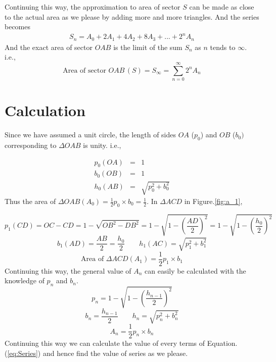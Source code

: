 \documentclass{jpconf}
\theoremstyle{definition} \newtheorem{Definition}{Def{\,}inition}
\begin{document}
Continuing this way, the approximation to area of sector $S$ can be made as close to the actual area as we please by adding more and more triangles. And the series becomes
\begin{eqnarray} \label{eq:Series}
S_n = A_0 + 2A_1 + 4A_2 + 8A_3 + ... + 2^{n}A_n
\end{eqnarray}
And the exact area of sector $OAB$ is the limit of the sum $S_n$ as $n$ tends to $\infty$. i.e.,\[\text{Area of sector } OAB\, (S)= S_\infty = \sum_{n = 0}^{\infty} 2^{n}A_n \]
\section{Calculation}
Since we have assumed a unit circle, the length of sides $OA$ ($p_0$) and $OB$ ($b_0)$ corresponding to $\Delta OAB$ is unity. i.e.,

\begin{eqnarray}
p_0 (OA) &=& 1 \nonumber \\
b_0 (OB) &=& 1 \nonumber \\
h_0 (AB) &=& \sqrt{p_0^2+b_0^2} \nonumber
\end{eqnarray}
Thus the area of $\Delta OAB (A_0) = \frac{1}{2}p_0 \times b_0 = \frac{1}{2}$. In $\Delta ACD$ in Figure.\ref{fig:a_1},

\begin{equation}
p_1 (CD) = OC - CD = 1 - \sqrt{OB^2 - DB^2}  =   1 - \sqrt{1 - \left(\frac{AD}{2}\right)^2} = 1 - \sqrt{1 - \left(\frac{h_0}{2}\right)^2} \nonumber
\end{equation}
\begin{equation}
b_1 (AD) = \frac{AB}{2} =  \frac{h_0}{2} \qquad 
h_1 (AC) = \sqrt{p_1^2+b_1^2} \nonumber
\end{equation}
\begin{equation}
\text{Area of } \Delta ACD (A_1) = \frac{1}{2}p_1 \times b_1 \nonumber
\end{equation}
Continuing this way, the general  value of $A_n$ can easily be calculated with the knowledge of $p_n$ and $b_n$.
\begin{equation}
p_n = 1 - \sqrt{1 - \left(\frac{h_{n-1}}{2}\right)^2} \nonumber
\end{equation}
\begin{equation}
b_n  =  \frac{h_{n-1}}{2} \qquad 
h_n = \sqrt{p_n^2+b_n^2} \nonumber
\end{equation}
\begin{equation}
A_n = \frac{1}{2}p_n \times b_n \nonumber
\end{equation}
Continuing this way we can calculate the value of every terms of Equation. (\ref{eq:Series}) and hence find the value of series as we please.
\end{document}
